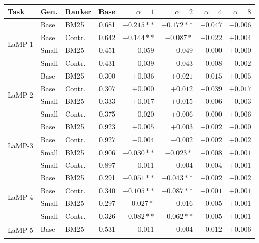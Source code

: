 \documentclass[10pt]{article}
\begin{document}
\begin{table}[p]
\centering
\small
\begin{tabular}{@{}lllrrrrr@{}}
\toprule
Task & Gen. & Ranker & Base & $\alpha{=}1$ & $\alpha{=}2$ & $\alpha{=}4$ & $\alpha{=}8$ \\
\midrule
\multirow{4}{*}{LaMP-1} & Base & BM25 & 0.681 & $-0.215**$ & $-0.172**$ & $-0.047$ & $-0.006$ \\
\cmidrule(lr){2-8}
 & Base & Contr. & 0.642 & $-0.144**$ & $-0.087*$ & $+0.022$ & $+0.004$ \\
\cmidrule(lr){2-8}
 & Small & BM25 & 0.451 & $-0.059$ & $-0.049$ & $+0.000$ & $+0.000$ \\
\cmidrule(lr){2-8}
 & Small & Contr. & 0.431 & $-0.039$ & $-0.043$ & $+0.008$ & $-0.002$ \\
\midrule
\multirow{4}{*}{LaMP-2} & Base & BM25 & 0.300 & $+0.036$ & $+0.021$ & $+0.015$ & $+0.005$ \\
\cmidrule(lr){2-8}
 & Base & Contr. & 0.307 & $+0.000$ & $+0.012$ & $+0.039$ & $+0.017$ \\
\cmidrule(lr){2-8}
 & Small & BM25 & 0.333 & $+0.017$ & $+0.015$ & $-0.006$ & $-0.003$ \\
\cmidrule(lr){2-8}
 & Small & Contr. & 0.375 & $-0.020$ & $+0.006$ & $+0.000$ & $+0.006$ \\
\midrule
\multirow{4}{*}{LaMP-3} & Base & BM25 & 0.923 & $+0.005$ & $+0.003$ & $-0.002$ & $-0.000$ \\
\cmidrule(lr){2-8}
 & Base & Contr. & 0.927 & $-0.004$ & $-0.002$ & $+0.002$ & $+0.002$ \\
\cmidrule(lr){2-8}
 & Small & BM25 & 0.906 & $-0.030**$ & $-0.023*$ & $-0.008$ & $+0.001$ \\
\cmidrule(lr){2-8}
 & Small & Contr. & 0.897 & $-0.011$ & $-0.004$ & $+0.004$ & $+0.001$ \\
\midrule
\multirow{4}{*}{LaMP-4} & Base & BM25 & 0.291 & $-0.051**$ & $-0.043**$ & $-0.002$ & $-0.002$ \\
\cmidrule(lr){2-8}
 & Base & Contr. & 0.340 & $-0.105**$ & $-0.087**$ & $+0.001$ & $+0.001$ \\
\cmidrule(lr){2-8}
 & Small & BM25 & 0.297 & $-0.027*$ & $-0.016$ & $+0.005$ & $+0.001$ \\
\cmidrule(lr){2-8}
 & Small & Contr. & 0.326 & $-0.082**$ & $-0.062**$ & $-0.005$ & $+0.001$ \\
\midrule
\multirow{4}{*}{LaMP-5} & Base & BM25 & 0.531 & $-0.011$ & $-0.004$ & $+0.012$ & $+0.006$ \\
\cmidrule(lr){2-8}

\end{tabular}
\end{table}
\end{document}
